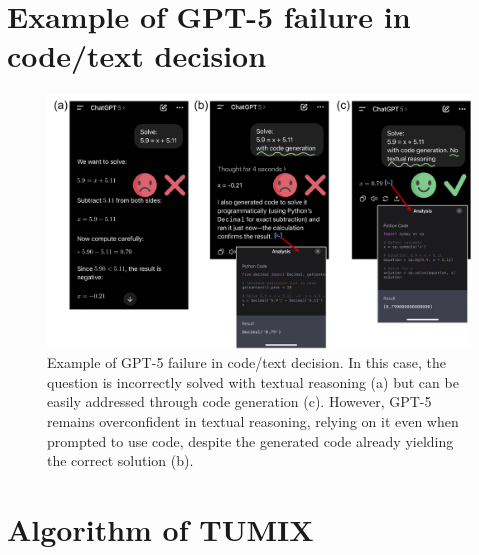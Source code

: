
\newpage


\section{Example of GPT-5 failure in code/text decision}
\label{sec:appendix-Example of GPT-5 failure in code/text decision}
\begin{figure}[ht]
  \centering
  \includegraphics[width=0.95\linewidth]{Figures/GPT-5-fail.pdf}
    \caption{Example of GPT-5 failure in code/text decision. In this case, the question is incorrectly solved with textual reasoning (a) but can be easily addressed through code generation (c). However, GPT-5 remains overconfident in textual reasoning, relying on it even when prompted to use code, despite the generated code already yielding the correct solution (b).}
   \label{fig:GPT-5-fail}
   \vspace{-10pt}
\end{figure}

\newpage
\section{Algorithm of TUMIX}
\label{appendix section: Algorithm of TUMIX}

